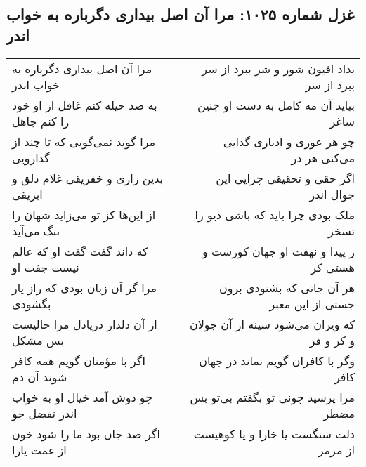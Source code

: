 \begin{center}
\section*{غزل شماره ۱۰۲۵: مرا آن اصل بیداری دگرباره به خواب اندر}
\label{sec:1025}
\begin{longtable}{l p{0.5cm} r}
مرا آن اصل بیداری دگرباره به خواب اندر
&&
بداد افیون شور و شر ببرد از سر ببرد از سر
\\
به صد حیله کنم غافل از او خود را کنم جاهل
&&
بیاید آن مه کامل به دست او چنین ساغر
\\
مرا گوید نمی‌گویی که تا چند از گدارویی
&&
چو هر عوری و ادباری گدایی می‌کنی هر در
\\
بدین زاری و خفریقی غلام دلق و ابریقی
&&
اگر حقی و تحقیقی چرایی این جوال اندر
\\
از این‌ها کز تو می‌زاید شهان را ننگ می‌آید
&&
ملک بودی چرا باید که باشی دیو را تسخر
\\
که داند گفت گفت او که عالم نیست جفت او
&&
ز پیدا و نهفت او جهان کورست و هستی کر
\\
مرا گر آن زبان بودی که راز یار بگشودی
&&
هر آن جانی که بشنودی برون جستی از این معبر
\\
از آن دلدار دریادل مرا حالیست بس مشکل
&&
که ویران می‌شود سینه از آن جولان و کر و فر
\\
اگر با مؤمنان گویم همه کافر شوند آن دم
&&
وگر با کافران گویم نماند در جهان کافر
\\
چو دوش آمد خیال او به خواب اندر تفضل جو
&&
مرا پرسید چونی تو بگفتم بی‌تو بس مضطر
\\
اگر صد جان بود ما را شود خون از غمت یارا
&&
دلت سنگست یا خارا و یا کوهیست از مرمر
\\
\end{longtable}
\end{center}
